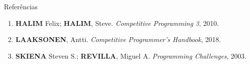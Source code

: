 \begin{frame}[fragile]{Referências}

    \begin{enumerate}
        \item \textbf{HALIM} Felix; \textbf{HALIM}, Steve. \textit{Competitive Programming 3}, 2010.
        \item \textbf{LAAKSONEN}, Antti. \textit{Competitive Programmer's Handbook}, 2018.
        \item \textbf{SKIENA} Steven S.; \textbf{REVILLA}, Miguel A. \textit{Programming Challenges}, 2003.
    \end{enumerate}

\end{frame}
